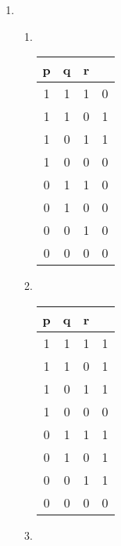 \documentclass{article}
\begin{document}
\begin{enumerate}
\begin{enumerate}
	      \end{enumerate}

	\item \begin{enumerate}
		      \item ~


		            \begin{tabular}{|c|c|c||c|}
			            \hline
			            p & q & r &   \\
			            \hline
			            1 & 1 & 1 & 0 \\
			            \hline
			            1 & 1 & 0 & 1 \\
			            \hline
			            1 & 0 & 1 & 1 \\
			            \hline
			            1 & 0 & 0 & 0 \\
			            \hline
			            0 & 1 & 1 & 0 \\
			            \hline
			            0 & 1 & 0 & 0 \\
			            \hline
			            0 & 0 & 1 & 0 \\
			            \hline
			            0 & 0 & 0 & 0 \\
			            \hline
		            \end{tabular}

		      \item ~

		            \begin{tabular}{|c|c|c||c|}
			            \hline
			            p & q & r &   \\
			            \hline
			            1 & 1 & 1 & 1 \\
			            \hline
			            1 & 1 & 0 & 1 \\
			            \hline
			            1 & 0 & 1 & 1 \\
			            \hline
			            1 & 0 & 0 & 0 \\
			            \hline
			            0 & 1 & 1 & 1 \\
			            \hline
			            0 & 1 & 0 & 1 \\
			            \hline
			            0 & 0 & 1 & 1 \\
			            \hline
			            0 & 0 & 0 & 0 \\
			            \hline
		            \end{tabular}

		      \item ~



\end{enumerate}
\end{enumerate}
\end{document}
